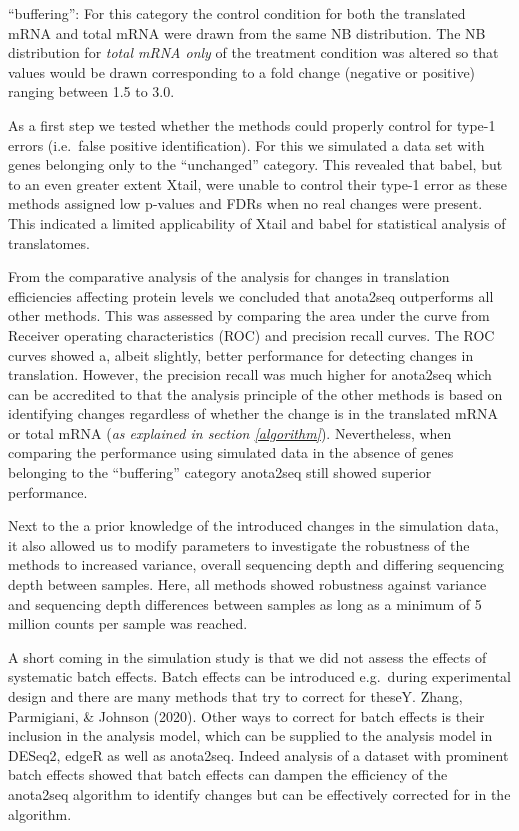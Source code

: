 \documentclass[
  12pt,
  openany]{book}
\begin{document}
``buffering'': For this category the control condition for both the translated mRNA and total mRNA were drawn from the same NB distribution. The NB distribution for \emph{total mRNA only} of the treatment condition was altered so that values would be drawn corresponding to a fold change (negative or positive) ranging between 1.5 to 3.0.

As a first step we tested whether the methods could properly control for type-1 errors (i.e.~false positive identification). For this we simulated a data set with genes belonging only to the ``unchanged'' category. This revealed that babel, but to an even greater extent Xtail, were unable to control their type-1 error as these methods assigned low p-values and FDRs when no real changes were present. This indicated a limited applicability of Xtail and babel for statistical analysis of translatomes.

From the comparative analysis of the analysis for changes in translation efficiencies affecting protein levels we concluded that anota2seq outperforms all other methods. This was assessed by comparing the area under the curve from Receiver operating characteristics (ROC) and precision recall curves. The ROC curves showed a, albeit slightly, better performance for detecting changes in translation. However, the precision recall was much higher for anota2seq which can be accredited to that the analysis principle of the other methods is based on identifying changes regardless of whether the change is in the translated mRNA or total mRNA (\emph{as explained in section \ref{algorithm}}). Nevertheless, when comparing the performance using simulated data in the absence of genes belonging to the ``buffering'' category anota2seq still showed superior performance.

Next to the a prior knowledge of the introduced changes in the simulation data, it also allowed us to modify parameters to investigate the robustness of the methods to increased variance, overall sequencing depth and differing sequencing depth between samples. Here, all methods showed robustness against variance and sequencing depth differences between samples as long as a minimum of 5 million counts per sample was reached.

A short coming in the simulation study is that we did not assess the effects of systematic batch effects. Batch effects can be introduced e.g.~during experimental design and there are many methods that try to correct for theseY. Zhang, Parmigiani, \& Johnson (2020). Other ways to correct for batch effects is their inclusion in the analysis model, which can be supplied to the analysis model in DESeq2, edgeR as well as anota2seq. Indeed analysis of a dataset with prominent batch effects showed that batch effects can dampen the efficiency of the anota2seq algorithm to identify changes but can be effectively corrected for in the algorithm.
\end{document}
